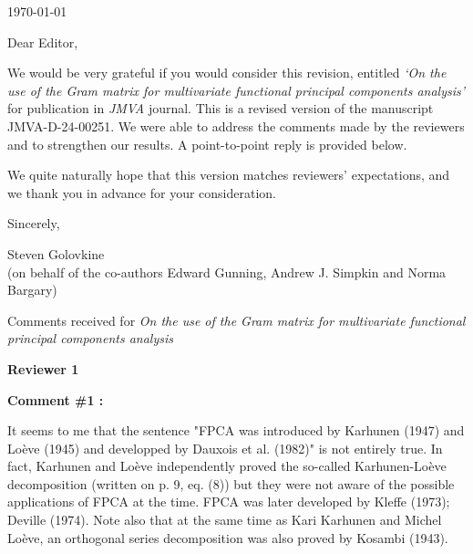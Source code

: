 \documentclass[11pt]{article}
\begin{document}
\qquad

\qquad

\qquad


\qquad

\qquad

\qquad

\newcommand{\thedate}{\today}

\thedate

\qquad

\qquad

\qquad



Dear Editor,

\qquad


We would be very grateful if you would consider this revision, entitled \emph{`On the use of the Gram matrix for multivariate functional principal components analysis'} for publication in \emph{JMVA} journal. This is a revised version of the manuscript JMVA-D-24-00251. We were able to address the comments made by the reviewers and to strengthen our results. A point-to-point reply is provided below. 

\quad

We quite naturally hope that this version matches reviewers' expectations, and we thank you in advance for your consideration.



\quad


Sincerely, 

\medskip



 Steven Golovkine 
 \\(on behalf of the co-authors  Edward Gunning, Andrew J. Simpkin and Norma Bargary)





\newpage


\begin{center}
{\large Comments received for \emph{On the use of the Gram matrix for multivariate functional principal components analysis}}\\
\end{center} 


\vspace*{1cm}


{\large \textbf{Reviewer 1} }


\bigskip

\itshape


\textbf{Comment \#1 :}

It seems to me that the sentence "FPCA was introduced by Karhunen (1947) and Loève (1945) and developped by Dauxois et al. (1982)" is not entirely true. In fact, Karhunen and Loève independently proved the so-called Karhunen-Loève decomposition (written on p. 9, eq. (8)) but they were not aware of the possible applications of FPCA at the time. FPCA was later developed by Kleﬀe (1973); Deville (1974). Note also that at the same time as Kari Karhunen and Michel Loève, an orthogonal series decomposition was also proved by Kosambi (1943).
\end{document}
